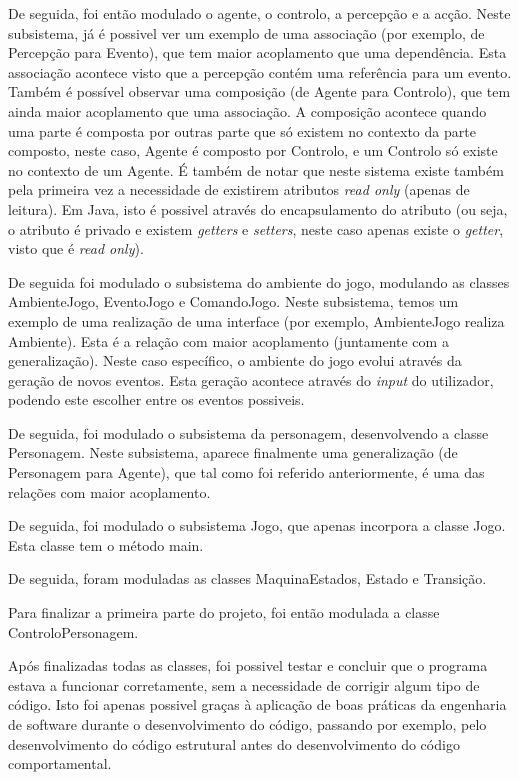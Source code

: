 \documentclass[a4paper,12pt]{article}
\begin{document}
De seguida, foi então modulado o agente, o controlo, a percepção e a acção.
Neste subsistema, já é possivel ver um exemplo de uma associação (por exemplo, de Percepção para Evento), que tem maior acoplamento que uma dependência. Esta associação acontece visto que a percepção contém uma referência para um evento.
Também é possível observar uma composição (de Agente para Controlo), que tem ainda maior acoplamento que uma associação. A composição acontece quando uma parte é composta por outras parte que só existem no contexto da parte composto, neste caso, Agente é composto por Controlo, e um Controlo só existe no contexto de um Agente.
É também de notar que neste sistema existe também pela primeira vez a necessidade de existirem atributos \textit{read only} (apenas de leitura). Em Java, isto é possivel através do encapsulamento do atributo (ou seja, o atributo é privado e existem \textit{getters} e \textit{setters}, neste caso apenas existe o \textit{getter}, visto que é \textit{read only}).

De seguida foi modulado o subsistema do ambiente do jogo, modulando as classes AmbienteJogo, EventoJogo e ComandoJogo.
Neste subsistema, temos um exemplo de uma realização de uma interface (por exemplo, AmbienteJogo realiza Ambiente). Esta é a relação com maior acoplamento (juntamente com a generalização).
Neste caso específico, o ambiente do jogo evolui através da geração de novos eventos. Esta geração acontece através do \textit{input} do utilizador, podendo este escolher entre os eventos possiveis.

De seguida, foi modulado o subsistema da personagem, desenvolvendo a classe Personagem.
Neste subsistema, aparece finalmente uma generalização (de Personagem para Agente), que tal como foi referido anteriormente, é uma das relações com maior acoplamento.

De seguida, foi modulado o subsistema Jogo, que apenas incorpora a classe Jogo.
Esta classe tem o método main.

De seguida, foram moduladas as classes MaquinaEstados, Estado e Transição.

Para finalizar a primeira parte do projeto, foi então modulada a classe ControloPersonagem.

Após finalizadas todas as classes, foi possivel testar e concluir que o programa estava a funcionar corretamente, sem a necessidade de corrigir algum tipo de código. Isto foi apenas possivel graças à aplicação de boas práticas da engenharia de software durante o desenvolvimento do código, passando por exemplo, pelo desenvolvimento do código estrutural antes do desenvolvimento do código comportamental.
\end{document}
